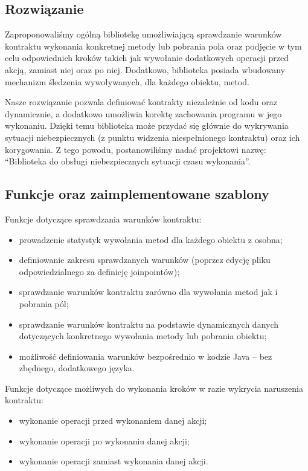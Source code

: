 \documentclass[12pt,a4paper,titlepage]{article}
\begin{document}
 \subsection{Rozwiązanie}
  Zaproponowaliśmy ogólną bibliotekę umożliwiającą sprawdzanie warunków kontraktu wykonania konkretnej metody lub pobrania pola oraz podjęcie w tym celu odpowiednich kroków takich jak wywołanie dodatkowych operacji przed akcją, zamiast niej oraz po niej. Dodatkowo, biblioteka posiada wbudowany mechanizm śledzenia wywoływanych, dla każdego obiektu, metod.
   
  Nasze rozwiązanie pozwala definiować kontrakty niezależnie od kodu oraz dynamicznie, a dodatkowo umożliwia korektę zachowania programu w jego wykonaniu. Dzięki temu biblioteka może przydać się głównie do wykrywania sytuacji niebezpiecznych (z punktu widzenia niespełnionego kontraktu) oraz ich korygowania. Z tego powodu, postanowiliśmy nadać projektowi nazwę: ``Biblioteka do obsługi niebezpiecznych sytuacji czasu wykonania''.
  
  \subsection{Funkcje oraz zaimplementowane szablony}
   Funkcje dotyczące sprawdzania warunków kontraktu:
   \begin{itemize}
    \item prowadzenie statystyk wywołania metod dla każdego obiektu z osobna;
    \item definiowanie zakresu sprawdzanych warunków (poprzez edycję pliku odpowiedzialnego za definicję joinpointów);
    \item sprawdzanie warunków kontraktu zarówno dla wywołania metod jak i pobrania pól;
    \item sprawdzanie warunków kontraktu na podstawie dynamicznych danych dotyczących konkretnego wywołania metody lub pobrania obiektu;
    \item możliwość definiowania warunków bezpośrednio w kodzie Java -- bez zbędnego, dodatkowego języka.
   \end{itemize}
   
    Funkcje dotyczące możliwych do wykonania kroków w razie wykrycia naruszenia kontraktu:
    \begin{itemize}
     \item wykonanie operacji przed wykonaniem danej akcji;
     \item wykonanie operacji po wykonaniu danej akcji;
     \item wykonanie operacji zamiast wykonania danej akcji.
    \end{itemize}
    
\end{document}
